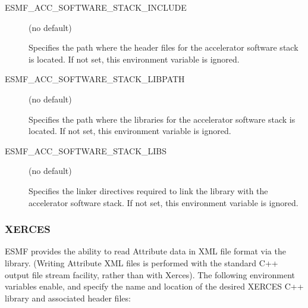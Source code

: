 \begin{description}
\begin{description}
\end{description}

\item[ESMF\_ACC\_SOFTWARE\_STACK\_INCLUDE] (no default)

Specifies the path where the header files for the accelerator software
stack is located. If not set, this environment variable is ignored.

\item[ESMF\_ACC\_SOFTWARE\_STACK\_LIBPATH] (no default)

Specifies the path where the libraries for the accelerator software
stack is located. If not set, this environment variable is ignored.

\item[ESMF\_ACC\_SOFTWARE\_STACK\_LIBS] (no default)

Specifies the linker directives required to link the library with
the accelerator software stack. If not set, this environment variable
is ignored.

\end{description}


\subsubsection{XERCES}
\label{sec:xerces}
ESMF provides the ability to read Attribute data in XML file format
via the 
library.  (Writing Attribute XML files is performed with the standard C++
output file stream facility, rather than with Xerces).  The following
environment variables enable, and specify the name and location of the
desired XERCES C++ library and associated header files:

